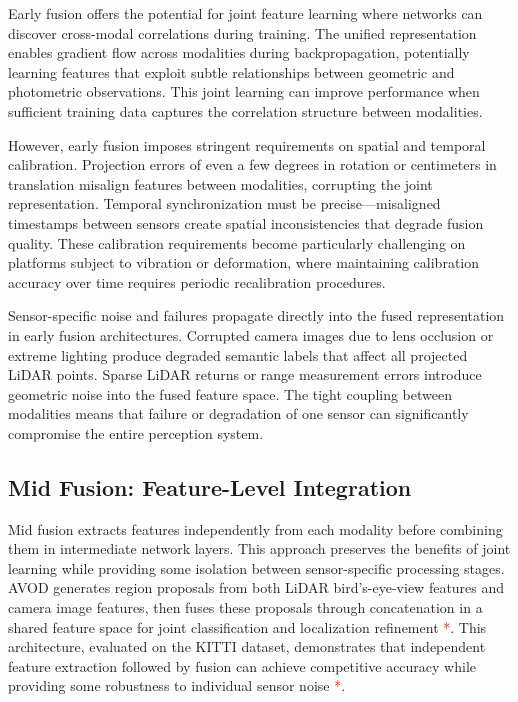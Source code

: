 \documentclass[../main.tex]{subfiles}
\begin{document}
Early fusion offers the potential for joint feature learning where networks can discover cross-modal correlations during training. The unified representation enables gradient flow across modalities during backpropagation, potentially learning features that exploit subtle relationships between geometric and photometric observations. This joint learning can improve performance when sufficient training data captures the correlation structure between modalities.

However, early fusion imposes stringent requirements on spatial and temporal calibration. Projection errors of even a few degrees in rotation or centimeters in translation misalign features between modalities, corrupting the joint representation. Temporal synchronization must be precise—misaligned timestamps between sensors create spatial inconsistencies that degrade fusion quality. These calibration requirements become particularly challenging on platforms subject to vibration or deformation, where maintaining calibration accuracy over time requires periodic recalibration procedures.

Sensor-specific noise and failures propagate directly into the fused representation in early fusion architectures. Corrupted camera images due to lens occlusion or extreme lighting produce degraded semantic labels that affect all projected LiDAR points. Sparse LiDAR returns or range measurement errors introduce geometric noise into the fused feature space. The tight coupling between modalities means that failure or degradation of one sensor can significantly compromise the entire perception system.

\subsection{Mid Fusion: Feature-Level Integration}

Mid fusion extracts features independently from each modality before combining them in intermediate network layers. This approach preserves the benefits of joint learning while providing some isolation between sensor-specific processing stages. AVOD generates region proposals from both LiDAR bird's-eye-view features and camera image features, then fuses these proposals through concatenation in a shared feature space for joint classification and localization refinement \textcolor{red}{*}. This architecture, evaluated on the KITTI dataset, demonstrates that independent feature extraction followed by fusion can achieve competitive accuracy while providing some robustness to individual sensor noise \textcolor{red}{*}.
\end{document}
